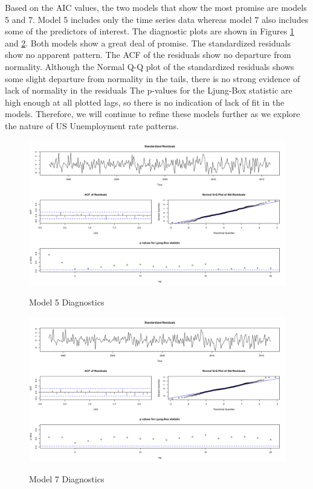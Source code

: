 {		Based on the AIC values, the two models that show the most promise are models 5 and 7.  Model 5 includes only the time series data whereas model 7 also includes some of the predictors of interest.  The diagnostic plots are shown in Figures \ref{fig:mod5} and \ref{fig:mod7}. Both models show a great deal of promise.  The standardized residuals show no apparent pattern. The ACF of the residuals show no departure from normality. Although the Normal Q-Q plot of the standardized residuals shows some slight departure from normality in the tails, there is no strong evidence of lack of normality in the residuals  The p-values for the  Ljung-Box statistic are high enough at all plotted lags, so there is no indication of lack of fit in the models. Therefore, we will continue to refine these models further as we explore the nature of US Unemployment rate patterns.

\begin{figure}[H]
      	\centering
      	\caption{Model 5 Diagnostics}
      	\includegraphics[width=\linewidth]{images/mod5}
      	\label{fig:mod5}
\end{figure}

\begin{figure}[H]
      	\centering
      	\caption{Model 7 Diagnostics}
      	\includegraphics[width=\linewidth]{images/mod7}
      	\label{fig:mod7}
\end{figure}

\begin{flushleft}
\end{flushleft}
}
  

